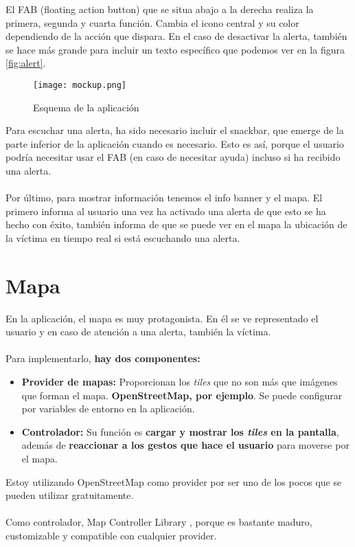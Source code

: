 El FAB (floating action button) que se situa abajo a la derecha realiza la primera, segunda y cuarta función. 
Cambia el icono central y su color dependiendo de la acción que dispara. En el caso de desactivar la alerta,
también se hace más grande para incluir un texto específico que podemos ver en la figura \ref{fig:alert}.

\begin{figure}[H]
	\centering	
	\texttt{[image: mockup.png]}
	\caption{Esquema de la aplicación}
	\end{figure}

Para escuchar una alerta, ha sido necesario incluir el snackbar, que emerge de la parte inferior de la aplicación cuando es necesario.
Esto es así, porque el usuario podría necesitar usar el FAB (en caso de necesitar ayuda) incluso si ha recibido una alerta. \\ \\

Por último, para mostrar información tenemos el info banner y el mapa. El primero informa al usuario una vez ha activado
una alerta de que esto se ha hecho con éxito, también informa de que se puede ver en el mapa la ubicación de la víctima en tiempo real
si está escuchando una alerta.

\section{Mapa}
En la aplicación, el mapa es muy protagonista. En él se ve representado el usuario y en caso de
atención a una alerta, también la víctima. \\ \\
Para implementarlo, \textbf{hay dos componentes:}
 \begin{itemize}
   \item \textbf{Provider de mapas:} Proporcionan los \textit{tiles} que no son más que imágenes que forman el mapa. \textbf{OpenStreetMap, por ejemplo}. Se puede configurar por variables de entorno en la aplicación.
   \item \textbf{Controlador:} Su función es \textbf{cargar y mostrar los \textit{tiles} en la pantalla}, además de \textbf{reaccionar a los gestos que hace el usuario} para moverse por el mapa. 
 \end{itemize}

 Estoy utilizando OpenStreetMap como provider \cite{openstreetmap} por ser uno de los pocos que se pueden utilizar gratuitamente. \\ \\
 Como controlador, Map Controller Library \cite{map}, porque es bastante maduro, customizable y compatible con cualquier provider.

